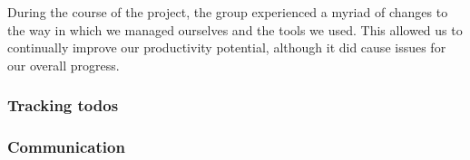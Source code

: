 During the course of the project, the group experienced a myriad of changes to the way in which we managed ourselves and the tools we used. This allowed us to continually improve our productivity potential, although it did cause issues for our overall progress.

\subsubsection{Tracking todos}



\subsubsection{Communication}








